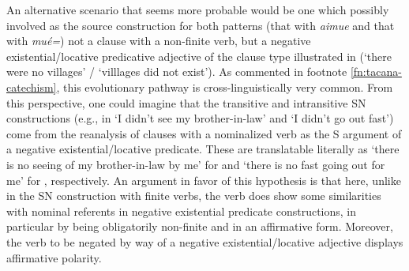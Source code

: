 \documentclass[output=paper]{langsci/langscibook}
\begin{document}
An alternative scenario that seems more probable would be one
which possibly involved as the source construction for both patterns (that
with \textit{aimue} and that with \textit{mué=}) not a clause with a
non-finite verb, but a negative existential\slash locative
predicative adjective of the clause type illustrated in
 (`there were no villages' / `villlages did not
exist'). As commented in footnote \ref{fn:tacana-catechism}, this evolutionary
pathway is cross-linguistically very common. From this perspective, one
could imagine that the transitive and intransitive SN constructions (e.g.,
in  `I didn't see my brother-in-law' and
 `I didn't go out fast') come from the reanalysis
of clauses with a nominalized verb as the S argument of a negative
existential\slash locative predicate. These are translatable literally as `there is
no seeing of my brother-in-law by me' for  and
`there is no fast going out for me' for ,
respectively. An argument in favor of this hypothesis is that here, unlike
in the SN construction with finite verbs, the verb does show some
similarities with nominal referents in negative existential predicate
constructions, in particular by being obligatorily non-finite and in an
affirmative form. Moreover, the verb to be negated by way of a negative
existential\slash locative adjective displays affirmative polarity.
\end{document}
